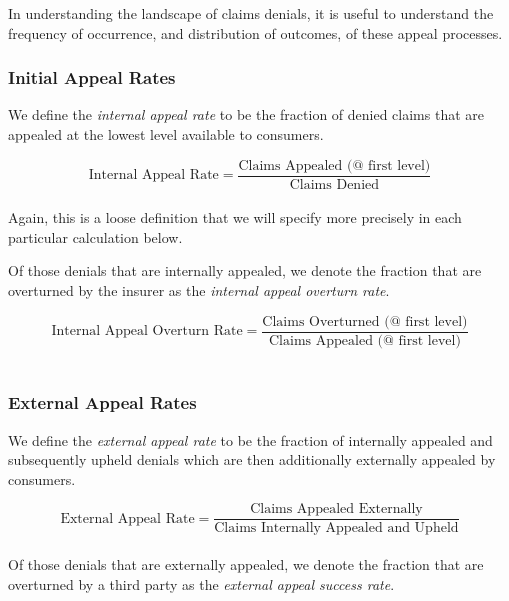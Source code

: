 \documentclass[12pt, a4paper,twoside,parskip=full]{report}
\theoremstyle{plain} %
\theoremstyle{definition} %
\theoremstyle{remark} %
\numberwithin{equation}{chapter}
\begin{document}
		In understanding the landscape of claims denials, it is useful to understand the frequency of occurrence, and distribution of outcomes, of these appeal processes.
		
		\subsubsection{Initial Appeal Rates}
		
		We define the \emph{internal appeal rate} to be the fraction of denied claims that are appealed at the lowest level available to consumers.
		
		\begin{equation*}
			\text{Internal Appeal Rate} = \dfrac{\text{Claims Appealed (@ first level)}}{\text{Claims Denied}}
		\end{equation*}
		\hfill\\
		
		Again, this is a loose definition that we will specify more precisely in each particular calculation below.
		
		Of those denials that are internally appealed, we denote the fraction that are overturned by the insurer as the \emph{internal appeal overturn rate}.
		
		\begin{equation*}
			\text{Internal Appeal Overturn Rate} = \dfrac{\text{Claims Overturned (@ first level)}}{\text{Claims Appealed (@ first level)}}
		\end{equation*}
		\hfill\\
		
		
		\subsubsection{External Appeal Rates}
		
		We define the \emph{external appeal rate} to be the fraction of internally appealed and subsequently upheld denials which are then additionally externally appealed by consumers.
		
		\begin{equation*}
			\text{External Appeal Rate} = \dfrac{\text{Claims Appealed Externally}}{\text{Claims Internally Appealed and Upheld}}
		\end{equation*}
		\hfill\\
		
		
		Of those denials that are externally appealed, we denote the fraction that are overturned by a third party as the \emph{external appeal success rate}.
		
\end{document}
